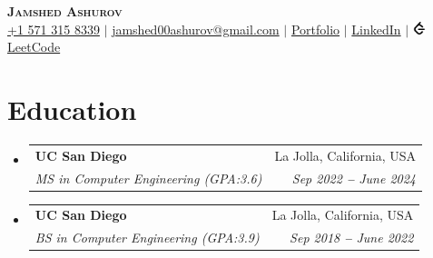 \documentclass[letterpaper,11pt]{article}
\makeatletter
\newcommand{\faLeetcode}{\includegraphics[height=1em]{leetcode.png}}
\newcommand{\resumeSubheading}[4]{
  \vspace{-2pt}\item
    \begin{tabular*}{0.97\textwidth}[t]{l@{\extracolsep{\fill}}r}
      \textcolor{secondary_color}{\textbf{#1}} & \textcolor{secondary_color}{#2} \\
      \textit{\small#3} & \textit{\small #4} \\
    \end{tabular*}\vspace{-7pt}
}
\newcommand{\resumeSubHeadingListStart}{\begin{itemize}[leftmargin=0.15in, label={}]}
\newcommand{\resumeSubHeadingListEnd}{\end{itemize}}
\makeatother
\begin{document}

\begin{center}
    \textbf{\Huge \scshape \textcolor{main_color}{Jamshed Ashurov}} \\ \vspace{3pt}
    \small
    \faMobile \hspace{.5pt} \href{tel:15713158339}{+1 571 315 8339}
    $|$
    \faAt \hspace{.5pt} \href{mailto:jamshed00ashurov@gmail.com}{jamshed00ashurov@gmail.com}
    $|$
    \faGlobe \hspace{.5pt} \href{https://ashurja.github.io/}{\textcolor{secondary_color}{Portfolio}}
    $|$
    \faLinkedinSquare \hspace{.5pt} \href{https://www.linkedin.com/in/jamshed-ashurov/}{\textcolor{secondary_color}{LinkedIn}}
    $|$
    \faLeetcode \hspace{.5pt} \href{https://leetcode.com/u/jashurov/}{\textcolor{secondary_color}{LeetCode}}
\end{center}




\section{Education}
  \vspace{3pt}
  \resumeSubHeadingListStart
    \resumeSubheading
      {UC San Diego}{La Jolla, California, USA}
      {MS in Computer Engineering (GPA:3.6)}{Sep 2022 \textbf{--} June 2024}
    \resumeSubheading
      {UC San Diego}{La Jolla, California, USA}
      {BS in Computer Engineering (GPA:3.9)}{Sep 2018 \textbf{--} June 2022}

    
  \resumeSubHeadingListEnd

\end{document}
